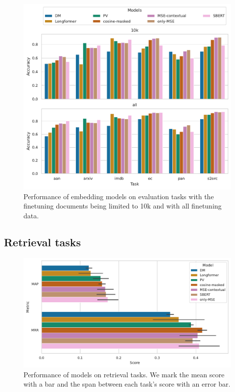 \begin{figure}

  \centering
  \includegraphics[width=\textwidth]{img/final_cls_evals.pdf}

  \caption{Performance of embedding models on evaluation tasks with the finetuning documents being limited to 10k and with all finetuning data.}

  \label{fig:final_cls_evals}

\end{figure}

\subsection{Retrieval tasks}

\begin{figure}[p]

  \includegraphics[width=\textwidth]{img/final_sims_evals.pdf}

  \caption{Performance of models on retrieval tasks. We mark the mean score
  with a bar and the span between each task's score with an error bar.}

  \label{fig:final_eval_sims}

\end{figure}

